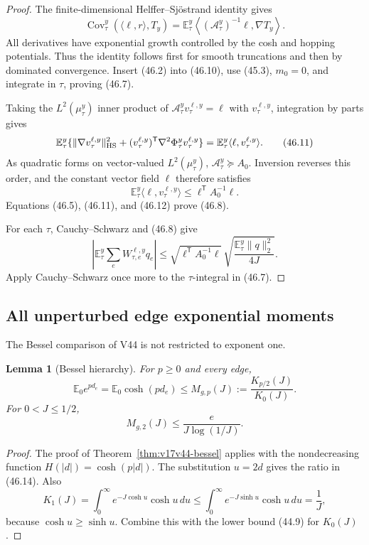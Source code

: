 \documentclass[11pt]{article}
\newtheorem{lemma}[theorem]{Lemma}
\theoremstyle{remark}
\begin{document}
\begin{proof}
The finite-dimensional Helffer--Sj\"ostrand identity gives
\[
 \operatorname{Cov}_\tau^y(\langle\ell,r\rangle,T_y)
 =
 \mathbb E_\tau^y
 \left\langle
 (\mathscr A_\tau^y)^{-1}\ell,\nabla T_y
 \right\rangle.                                  \tag{46.10}
\]
All derivatives have exponential growth controlled by the cosh and
hopping potentials.  Thus the identity follows first for smooth
truncations and then by dominated convergence.  Insert (46.2) into
(46.10), use (45.3), \(m_0=0\), and integrate in \(\tau\), proving
(46.7).

Taking the \(L^2(\mu_\tau^y)\) inner product of
\(\mathscr A_\tau^yv_\tau^{\ell,y}=\ell\) with
\(v_\tau^{\ell,y}\), integration by parts gives
\[
 \mathbb E_\tau^y\{
 \|\nabla v_\tau^{\ell,y}\|_{\rm HS}^2+
 (v_\tau^{\ell,y})^{\mathsf T}
 \nabla^2\Phi_\tau^y v_\tau^{\ell,y}\}
 =
 \mathbb E_\tau^y\langle\ell,v_\tau^{\ell,y}\rangle.             \tag{46.11}
\]
As quadratic forms on vector-valued \(L^2(\mu_\tau^y)\),
\(\mathscr A_\tau^y\succeq A_0\).  Inversion reverses this order, and
the constant vector field \(\ell\) therefore satisfies
\[
 \mathbb E_\tau^y\langle\ell,v_\tau^{\ell,y}\rangle
 \leq\ell^{\mathsf T}A_0^{-1}\ell.                \tag{46.12}
\]
Equations (46.5), (46.11), and (46.12) prove (46.8).

For each \(\tau\), Cauchy--Schwarz and (46.8) give
\[
\left|
 \mathbb E_\tau^y\sum_eW_{\tau,e}^{\ell,y}q_e
 \right|
 \leq
 \sqrt{\ell^{\mathsf T}A_0^{-1}\ell}\,
 \sqrt{\frac{\mathbb E_\tau^y\|q\|_2^2}{4J}}.     \tag{46.13}
\]
Apply Cauchy--Schwarz once more to the \(\tau\)-integral in (46.7).
\end{proof}

\subsection{All unperturbed edge exponential moments}

The Bessel comparison of V44 is not restricted to exponent one.

\begin{lemma}[Bessel hierarchy]
\label{lem:v17v46-bessel}
For \(p\geq0\) and every edge,
\[
 \mathbb E_0e^{p d_e}
 =\mathbb E_0\cosh(pd_e)
 \leq
 M_{g,p}(J):=\frac{K_{p/2}(J)}{K_0(J)}.            \tag{46.14}
\]
For \(0<J\leq1/2\),
\[
 M_{g,2}(J)\leq
 \frac{e}{J\log(1/J)}.                            \tag{46.15}
\]
\end{lemma}

\begin{proof}
The proof of Theorem~\ref{thm:v17v44-bessel} applies with the
nondecreasing function \(H(|d|)=\cosh(p|d|)\).  The substitution
\(u=2d\) gives the ratio in (46.14).  Also
\[
 K_1(J)
 =\int_0^\infty e^{-J\cosh u}\cosh u\,du
 \leq\int_0^\infty e^{-J\sinh u}\cosh u\,du
 =\frac1J,                                        \tag{46.16}
\]
because \(\cosh u\geq\sinh u\).  Combine this with the lower bound
(44.9) for \(K_0(J)\).
\end{proof}
\end{document}
